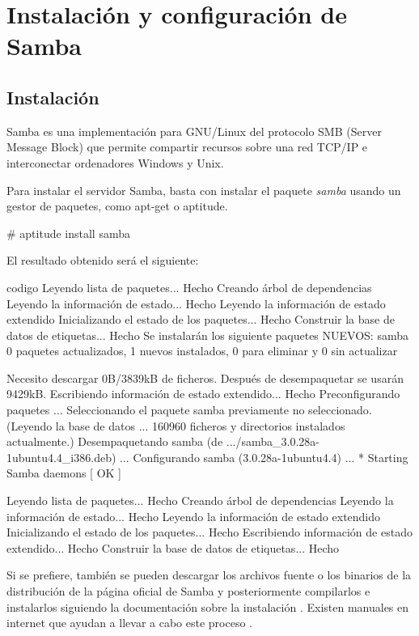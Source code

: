 \section{Instalación y configuración de Samba}
\label{Samba}

\subsection{Instalación}

Samba es una implementación para GNU/Linux del protocolo SMB (Server Message Block) que permite compartir recursos sobre una red TCP/IP e interconectar ordenadores Windows y Unix.

Para instalar el servidor Samba, basta con instalar el paquete \emph{samba} usando un gestor de paquetes, como apt-get o aptitude.

\begin{listing}[style=consola, numbers=none]
 # aptitude install samba
\end{listing}

El resultado obtenido será el siguiente:

\begin{SaveVerbatim}{codigo}
Leyendo lista de paquetes... Hecho
Creando árbol de dependencias
Leyendo la información de estado... Hecho
Leyendo la información de estado extendido
Inicializando el estado de los paquetes... Hecho
Construir la base de datos de etiquetas... Hecho
Se instalarán los siguiente paquetes NUEVOS:
  samba
0 paquetes actualizados, 1 nuevos instalados, 0 para eliminar y 0 sin actualizar

Necesito descargar 0B/3839kB de ficheros. Después de desempaquetar se usarán 9429kB.
Escribiendo información de estado extendido... Hecho
Preconfigurando paquetes ...
Seleccionando el paquete samba previamente no seleccionado.
(Leyendo la base de datos ...
160960 ficheros y directorios instalados actualmente.)
Desempaquetando samba (de .../samba_3.0.28a-1ubuntu4.4_i386.deb) ...
Configurando samba (3.0.28a-1ubuntu4.4) ...
 * Starting Samba daemons          [ OK ]

Leyendo lista de paquetes... Hecho
Creando árbol de dependencias
Leyendo la información de estado... Hecho
Leyendo la información de estado extendido
Inicializando el estado de los paquetes... Hecho
Escribiendo información de estado extendido... Hecho
Construir la base de datos de etiquetas... Hecho
\end{SaveVerbatim}


Si se prefiere, también se pueden descargar los archivos fuente o los binarios de la distribución de la página oficial de Samba \cite{sambadownload} y posteriormente compilarlos e instalarlos siguiendo la documentación sobre la instalación \cite{sambadocu}. Existen manuales en internet que ayudan a llevar a cabo este proceso \cite{sambawiki}.

